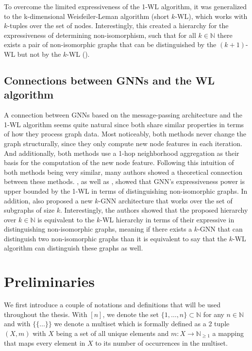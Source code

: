 \documentclass[11pt, dvipsnames, DIV=12]{scrreprt}
\theoremstyle{definition}
\newcommand{\MSopen}{\{\!\!\{}
\newcommand{\MSclose}{\}\!\!\}}
\begin{document}
To overcome the limited expressiveness of the 1-WL algorithm, it was generalized to the k-dimensional Weisfeiler-Leman algorithm (short $k$-WL), which works with $k$-tuples over the set of nodes. Interestingly, this created a hierarchy for the expressiveness of determining non-isomorphism, such that for all $k \in \mathbb{N}$ there exists a pair of non-isomorphic graphs that can be distinguished by the $(k+1)$-WL but not by the $k$-WL (\cite{Cai1992}).

\subsection{Connections between GNNs and the WL algorithm}\label{sec:conn gnn and 1wl}
A connection between GNNs based on the message-passing architecture and the 1-WL algorithm seems quite natural since both share similar properties in terms of how they process graph data. Most noticeably, both methods never change the graph structurally, since they only compute new node features in each iteration. And additionally, both methods use a 1-hop neighborhood aggregation as their basis for the computation of the new node feature. Following this intuition of both methods being very similar, many authors showed a theoretical connection between these methods. \cite{Morris2018}, as well as \cite{Xu2018}, showed that GNN's expressiveness power is upper bounded by the 1-WL in terms of distinguishing non-isomorphic graphs. In addition, \cite{Morris2018} also proposed a new $k$-GNN architecture that works over the set of subgraphs of size $k$. Interestingly, the authors showed that the proposed hierarchy over $k \in \mathbb{N}$ is equivalent to the $k$-WL hierarchy in terms of their expressive in distinguishing non-isomorphic graphs, meaning if there exists a $k$-GNN that can distinguish two non-isomorphic graphs than it is equivalent to say that the $k$-WL algorithm can distinguish these graphs as well.

\section{Preliminaries}
We first introduce a couple of notations and definitions that will be used throughout the thesis. With $[n]$, we denote the set $\{1, \ldots, n\} \subset \mathbb{N}$ for any $n \in \mathbb{N}$ and with $\MSopen \ldots \MSclose$ we denote a multiset which is formally defined as a 2 tuple $(X, m)$ with $X$ being a set of all unique elements and $m: X \rightarrow \mathbb{N}_{\geq 1}$ a mapping that maps every element in $X$ to its number of occurrences in the multiset.
\end{document}
